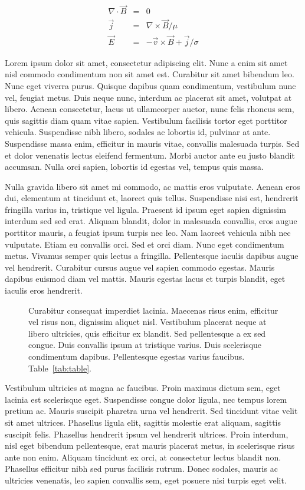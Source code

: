 \documentclass[]{aastex62}
\begin{document}
\begin{eqnarray} \label{eqn:other}
\nabla \cdot \vec{B} &=& 0 \\
\vec{j} &=& \nabla \times \vec{B} / \mu \\
\vec{E} &=& - \vec{v} \times \vec{B} + \vec{j} / \sigma
\end{eqnarray}


Lorem ipsum dolor sit amet, consectetur adipiscing elit. Nunc a enim sit amet nisl commodo condimentum non sit amet est. Curabitur sit amet bibendum leo. Nunc eget viverra purus. Quisque dapibus quam condimentum, vestibulum nunc vel, feugiat metus. Duis neque nunc, interdum ac placerat sit amet, volutpat at libero. Aenean consectetur, lacus ut ullamcorper auctor, nunc felis rhoncus sem, quis sagittis diam quam vitae sapien. Vestibulum facilisis tortor eget porttitor vehicula. Suspendisse nibh libero, sodales ac lobortis id, pulvinar at ante. Suspendisse massa enim, efficitur in mauris vitae, convallis malesuada turpis. Sed et dolor venenatis lectus eleifend fermentum. Morbi auctor ante eu justo blandit accumsan. Nulla orci sapien, lobortis id egestas vel, tempus quis massa.

Nulla gravida libero sit amet mi commodo, ac mattis eros vulputate. Aenean eros dui, elementum at tincidunt et, laoreet quis tellus. Suspendisse nisi est, hendrerit fringilla varius in, tristique vel ligula. Praesent id ipsum eget sapien dignissim interdum sed sed erat. Aliquam blandit, dolor in malesuada convallis, eros augue porttitor mauris, a feugiat ipsum turpis nec leo. Nam laoreet vehicula nibh nec vulputate. Etiam eu convallis orci. Sed et orci diam. Nunc eget condimentum metus. Vivamus semper quis lectus a fringilla. Pellentesque iaculis dapibus augue vel hendrerit. Curabitur cursus augue vel sapien commodo egestas. Mauris dapibus euismod diam vel mattis. Mauris egestas lacus et turpis blandit, eget iaculis eros hendrerit.

\begin{figure}[ht!]
\caption{Curabitur consequat imperdiet lacinia. Maecenas risus enim, efficitur vel risus non, dignissim aliquet nisl. Vestibulum placerat neque at libero ultricies, quis efficitur ex blandit. Sed pellentesque a ex sed congue. Duis convallis ipsum at tristique varius. Duis scelerisque condimentum dapibus. Pellentesque egestas varius faucibus. Table~\ref{tab:table}.}
\label{fig:figure}
\end{figure}

Vestibulum ultricies at magna ac faucibus. Proin maximus dictum sem, eget lacinia est scelerisque eget. Suspendisse congue dolor ligula, nec tempus lorem pretium ac. Mauris suscipit pharetra urna vel hendrerit. Sed tincidunt vitae velit sit amet ultrices. Phasellus ligula elit, sagittis molestie erat aliquam, sagittis suscipit felis. Phasellus hendrerit ipsum vel hendrerit ultrices. Proin interdum, nisl eget bibendum pellentesque, erat mauris placerat metus, in scelerisque risus ante non enim. Aliquam tincidunt ex orci, at consectetur lectus blandit non. Phasellus efficitur nibh sed purus facilisis rutrum. Donec sodales, mauris ac ultricies venenatis, leo sapien convallis sem, eget posuere nisi turpis eget velit.
\end{document}
